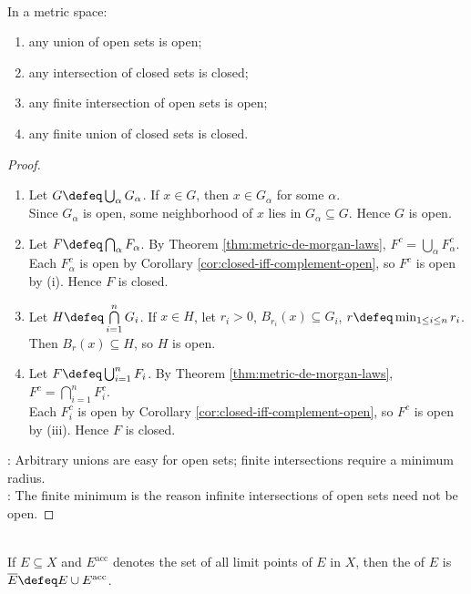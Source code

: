 \begin{theorem} \label{thm:metric-open-closed-set-calculus}\label{prop:metric-topology-basic-calculus-source-todo} \\
In a metric space:
\begin{enumerate}[label=(\roman*)]
\setlength{\itemsep}{0pt}
\item any union of open sets is open;
\item any intersection of closed sets is closed;
\item any finite intersection of open sets is open;
\item any finite union of closed sets is closed.
\end{enumerate}
\begin{proof}
\begin{enumerate}[label=(\roman*)]
\setlength{\itemsep}{0pt}
\item Let $G\defeq\bigcup_\alpha G_\alpha$. If $x\in G$, then $x\in G_\alpha$ for some $\alpha$.\\
Since $G_\alpha$ is open, some neighborhood of $x$ lies in $G_\alpha\subseteq G$. Hence $G$ is open.
\item Let $F\defeq\bigcap_\alpha F_\alpha$. By Theorem \ref{thm:metric-de-morgan-laws}, $F^c=\bigcup\limits_\alpha F_\alpha^c$.\\
Each $F_\alpha^c$ is open by Corollary \ref{cor:closed-iff-complement-open}, so $F^c$ is open by (i). Hence $F$ is closed.
\item Let $H\defeq\bigcap\limits_{i=1}^nG_i$. If $x\in H$, let $r_i>0$, $B_{r_i}(x)\subseteq G_i$, $r\defeq\min_{1\leq i\leq n}r_i$. Then $B_r(x)\subseteq H$, so $H$ is open.
\item Let $F\defeq\bigcup_{i=1}^nF_i$. By Theorem \ref{thm:metric-de-morgan-laws}, $F^c=\bigcap\limits_{i=1}^nF_i^c$.\\
Each $F_i^c$ is open by Corollary \ref{cor:closed-iff-complement-open}, so $F^c$ is open by (iii). Hence $F$ is closed.
\end{enumerate}
: Arbitrary unions are easy for open sets; finite intersections require a minimum radius.\\
: The finite minimum is the reason infinite intersections of open sets need not be open.
\end{proof}
\end{theorem}

\begin{definition} \label{def:metric-closure} \\
If $E\subseteq X$ and $E^{\operatorname{acc}}$ denotes the set of all limit points of $E$ in $X$, then the  of $E$ is $\overline{E}\defeq E\cup E^{\operatorname{acc}}$.
\end{definition}

